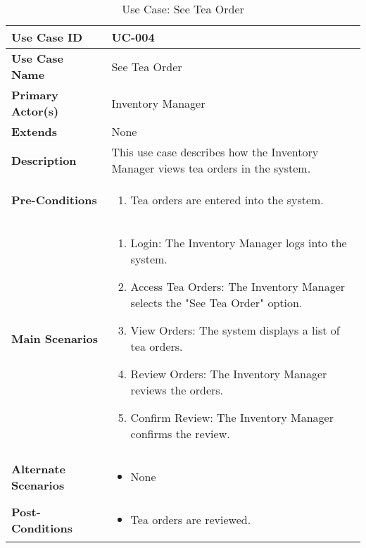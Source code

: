 \documentclass{article}
\begin{document}
\begin{table}[!ht]
    \centering
    \renewcommand{\arraystretch}{1.3} %
    \begin{tabularx}{\textwidth}{|l|X|}
        \hline
        \textbf{Use Case ID} & UC-004 \\
        \hline
        \textbf{Use Case Name} & See Tea Order \\
        \hline
        \textbf{Primary Actor(s)} & Inventory Manager \\
        \hline
        \textbf{Extends} & None \\
        \hline
        \textbf{Description} & This use case describes how the Inventory Manager views tea orders in the system. \\
        \hline
        \textbf{Pre-Conditions} & 
        \begin{enumerate}[label=\arabic*.,itemsep=0pt]
            \item Tea orders are entered into the system.
        \end{enumerate} \\
        \hline
        \textbf{Main Scenarios} & 
        \begin{enumerate}[label=\arabic*.,itemsep=0pt]
            \item Login: The Inventory Manager logs into the system.
            \item Access Tea Orders: The Inventory Manager selects the "See Tea Order" option.
            \item View Orders: The system displays a list of tea orders.
            \item Review Orders: The Inventory Manager reviews the orders.
            \item Confirm Review: The Inventory Manager confirms the review.
        \end{enumerate} \\
        \hline
        \textbf{Alternate Scenarios} & 
        \begin{itemize}[label=--,itemsep=0pt]
            \item None
        \end{itemize} \\
        \hline
        \textbf{Post-Conditions} & 
        \begin{itemize}[label=--,itemsep=0pt]
            \item Tea orders are reviewed.
        \end{itemize} \\
        \hline
    \end{tabularx}
    \caption{Use Case: See Tea Order}
    \label{tab:use-case-see-tea-order}
\end{table}
\end{document}
